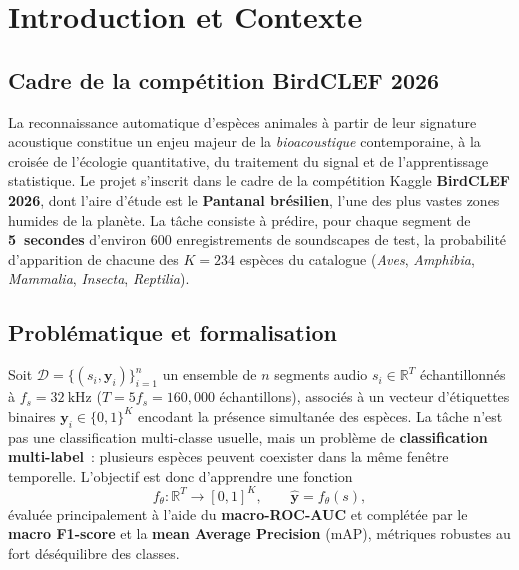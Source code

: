 \section{Introduction et Contexte}
\label{sec:intro}

\subsection{Cadre de la compétition BirdCLEF 2026}
La reconnaissance automatique d'espèces animales à partir de leur signature
acoustique constitue un enjeu majeur de la \textit{bioacoustique} contemporaine,
à la croisée de l'écologie quantitative, du traitement du signal et de
l'apprentissage statistique. Le projet s'inscrit dans le cadre de la
compétition Kaggle \textbf{BirdCLEF 2026}, dont l'aire d'étude est le
\textbf{Pantanal brésilien}, l'une des plus vastes zones humides de la
planète. La tâche consiste à prédire, pour chaque segment de \textbf{5~secondes}
d'environ 600 enregistrements de soundscapes de test, la probabilité
d'apparition de chacune des $K=234$ espèces du catalogue
(\textit{Aves}, \textit{Amphibia}, \textit{Mammalia}, \textit{Insecta},
\textit{Reptilia}).

\subsection{Problématique et formalisation}
Soit $\mathcal{D} = \{(s_i, \mathbf{y}_i)\}_{i=1}^{n}$ un ensemble de
$n$ segments audio $s_i \in \mathbb{R}^{T}$ échantillonnés à
$f_s = 32~\mathrm{kHz}$ ($T = 5 f_s = 160{,}000$ échantillons), associés à
un vecteur d'étiquettes binaires
$\mathbf{y}_i \in \{0,1\}^{K}$ encodant la présence simultanée des
espèces. La tâche n'est pas une classification multi-classe usuelle, mais un
problème de \textbf{classification multi-label}~: plusieurs espèces peuvent
coexister dans la même fenêtre temporelle. L'objectif est donc d'apprendre
une fonction
\[
    f_\theta : \mathbb{R}^{T} \longrightarrow [0,1]^{K},
    \qquad \hat{\mathbf{y}} = f_\theta(s),
\]
évaluée principalement à l'aide du \textbf{macro-ROC-AUC} et complétée par le
\textbf{macro F1-score} et la \textbf{mean Average Precision} (mAP), métriques
robustes au fort déséquilibre des classes.

